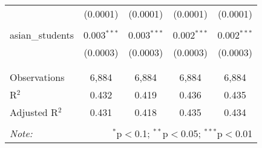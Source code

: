 \begin{table}[!htbp]
\begin{tabular}{@{\extracolsep{-2pt}}lcccc}
  & (0.0001) & (0.0001) & (0.0001) & (0.0001) \\ 
  & & & & \\ 
 asian\_students & 0.003$^{***}$ & 0.003$^{***}$ & 0.002$^{***}$ & 0.002$^{***}$ \\ 
  & (0.0003) & (0.0003) & (0.0003) & (0.0003) \\ 
  & & & & \\ 
\hline \\[-1.8ex] 
Observations & 6,884 & 6,884 & 6,884 & 6,884 \\ 
R$^{2}$ & 0.432 & 0.419 & 0.436 & 0.435 \\ 
Adjusted R$^{2}$ & 0.431 & 0.418 & 0.435 & 0.434 \\ 
\hline 
\hline \\[-1.8ex] 
\textit{Note:}  & \multicolumn{4}{r}{$^{*}$p$<$0.1; $^{**}$p$<$0.05; $^{***}$p$<$0.01} \\ 
\end{tabular} 
\end{table} 

